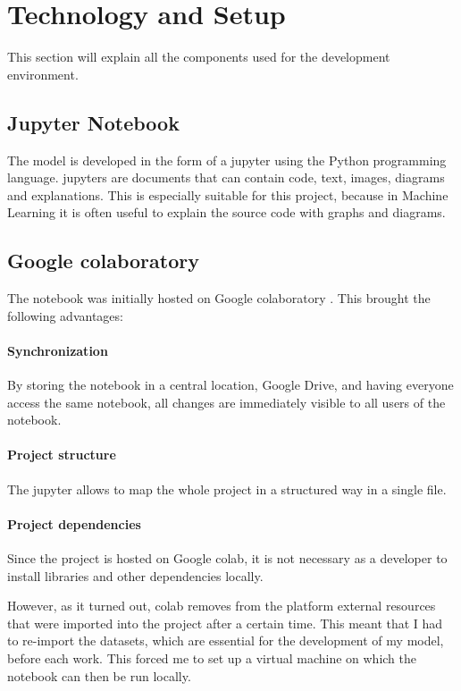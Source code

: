 \section{Technology and Setup}
\label{chap:tech}
This section will explain all the components used for the development environment. 
\subsection{Jupyter Notebook}
The model is developed in the form of a \gls{jupyter} \cite{noauthor_project_nodate} using the Python programming language. \gls{jupyter}s are documents that can contain code, text, images, diagrams and explanations. This is especially suitable for this project, because in Machine Learning it is often useful to explain the source code with graphs and diagrams.

\subsection{Google \gls{colab}oratory}
The notebook was initially hosted on Google \gls{colab}oratory \cite{colab}. This brought the following advantages:
\paragraph{Synchronization} 
By storing the notebook in a central location, Google Drive, and having everyone access the same notebook, all changes are immediately visible to all users of the notebook.
\paragraph{Project structure} 
The \gls{jupyter} allows to map the whole project in a structured way in a single file. 
\paragraph{Project dependencies}
Since the project is hosted on Google \gls{colab}, it is not necessary as a developer to install libraries and other dependencies locally.

However, as it turned out, \gls{colab} removes from the platform external resources that were imported into the project after a certain time. This meant that I had to re-import the datasets, which are essential for the development of my model, before each work. This forced me to set up a \gls{virtual machine} on which the notebook can then be run locally.


